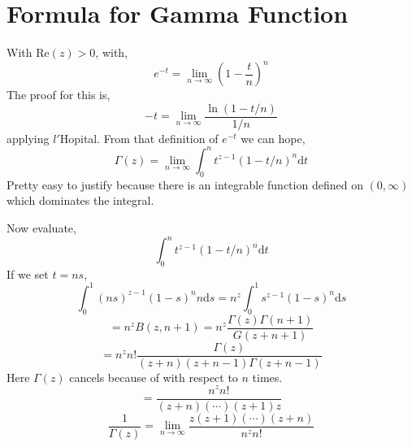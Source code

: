 \documentclass[letter]{article}
\begin{document}
\section*{Formula for Gamma Function} 

With $\text{Re}(z) > 0$, with, 
\[
e^{-t} = \lim_{n \to \infty} (1- \frac{t}{n})^{n}
\] 
The proof for this is, 
\[
-t = \lim_{n \to \infty} \frac{\ln\left(1 - t / n\right)}{{1} / { n}}
\]
applying $l' $Hopital. From that definition of $e^{-t}$ we can hope, 
\[
\Gamma(z) = \lim_{n \to \infty} \int_{0}^{n} t ^{z- 1} \left(1 - t / n \right)^{n} \mathrm{d}  t 
\] Pretty easy to justify because there is an integrable function defined on $(0, \infty)$ which dominates the integral. 

Now evaluate, 
\[
\int_{0 }^{n} t ^{ z - 1} ( 1 - t / n)^{n } \mathrm{d}  t 
\] 
If we set $t = ns$, 
\[
\int_{0}^{1} (ns)^{z- 1} (1  - s )^{n} n \mathrm{d} s =  n^{z}\int_{0}^{1}  s^{z-1} (1- s )^{n} \mathrm{d} s
\]
\[
= n^{z} B(z, n+1) = n^{z} \frac{\Gamma(z) \Gamma(n+1)}{G(z+n+1)}
\] 
\[
 = n ^{z} n! \frac{\Gamma(z)}{(z+n) (z+n-1)\Gamma(z+n-1)}
\] 
Here $\Gamma(z)$ cancels because of with respect to $n$ times. 
\[
= \frac{n^{z} n!}{(z+n)(\cdots)(z+1)z}
\]
\[
\frac{1}{\Gamma(z)} = \lim_{n \to \infty} \frac{z(z+1)(\cdots)(z+n)}{n^{z}n!}
\] 
\end{document}

